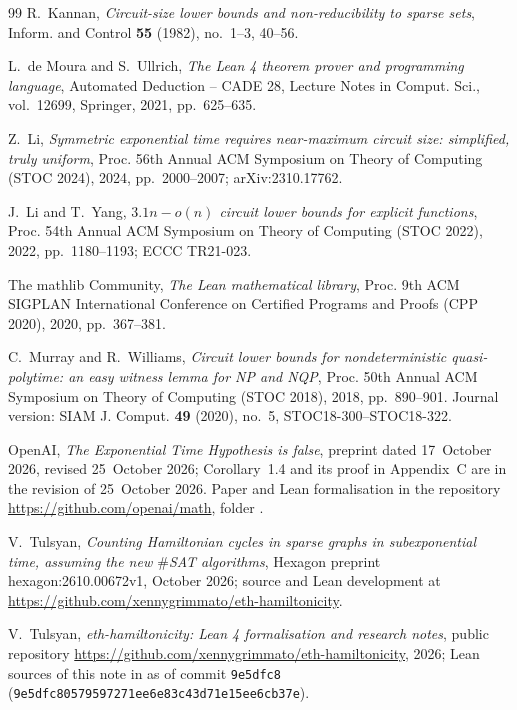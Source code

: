 \documentclass[10pt]{amsart}
\theoremstyle{plain}
\theoremstyle{definition}
\theoremstyle{remark}
\numberwithin{equation}{section}
\begin{document}
\begin{thebibliography}{99}
R.~Kannan, \emph{Circuit-size lower bounds and non-reducibility to sparse sets}, Inform. and Control
\textbf{55} (1982), no.~1--3, 40--56.

L.~de Moura and S.~Ullrich, \emph{The {L}ean 4 theorem prover and programming language}, Automated
Deduction -- CADE 28, Lecture Notes in Comput. Sci., vol.~12699, Springer, 2021, pp.~625--635.

Z.~Li, \emph{Symmetric exponential time requires near-maximum circuit size: simplified, truly
uniform}, Proc. 56th Annual ACM Symposium on Theory of Computing (STOC 2024), 2024, pp.~2000--2007;
arXiv:2310.17762.

J.~Li and T.~Yang, \emph{$3.1n-o(n)$ circuit lower bounds for explicit functions}, Proc. 54th Annual
ACM Symposium on Theory of Computing (STOC 2022), 2022, pp.~1180--1193; ECCC TR21-023.

The mathlib Community, \emph{The {L}ean mathematical library}, Proc. 9th ACM SIGPLAN International
Conference on Certified Programs and Proofs (CPP 2020), 2020, pp.~367--381.

C.~Murray and R.~Williams, \emph{Circuit lower bounds for nondeterministic quasi-polytime: an easy
witness lemma for {NP} and {NQP}}, Proc. 50th Annual ACM Symposium on Theory of Computing (STOC
2018), 2018, pp.~890--901. Journal version: SIAM J. Comput. \textbf{49} (2020), no.~5,
STOC18-300--STOC18-322.

OpenAI, \emph{The {E}xponential {T}ime {H}ypothesis is false}, preprint dated 17~October 2026, revised
25~October 2026; Corollary~1.4 and its proof in Appendix~C are in the revision of 25~October 2026.
Paper and Lean formalisation in the repository \url{https://github.com/openai/math}, folder
.

V.~Tulsyan, \emph{Counting {H}amiltonian cycles in sparse graphs in subexponential time, assuming the
new $\#${SAT} algorithms}, Hexagon preprint hexagon:2610.00672v1, October 2026; source and Lean
development at \url{https://github.com/xennygrimmato/eth-hamiltonicity}.

V.~Tulsyan, \emph{eth-hamiltonicity: {L}ean 4 formalisation and research notes}, public repository
\url{https://github.com/xennygrimmato/eth-hamiltonicity}, 2026; Lean sources of this note in
 as of commit \texttt{9e5dfc8}
(\texttt{9e5dfc80579597271ee6e83c43d71e15ee6cb37e}).


\end{thebibliography}
\end{document}
